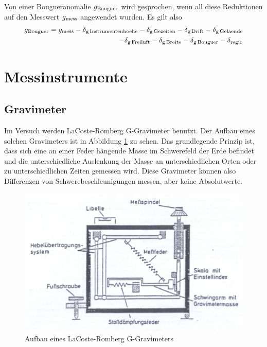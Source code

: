 Von einer Bougueranomalie $g_{\mathrm{Bouguer}}$ wird gesprochen, wenn all diese Reduktionen auf den Messwert $g_{\mathrm{mess}}$ angewendet wurden. Es gilt also
\begin{align}
 g_{\mathrm{Bouguer}}=g_{\mathrm{mess}}-\delta_{\mathrm{g\,Instrumentenhoehe}}-\delta_{\mathrm{g\,Gezeiten}}-\delta_{\mathrm{g\,Drift}}-\delta_{\mathrm{g\,Gelaende}} \\ \notag
 -\delta_{\mathrm{g\,Freiluft}}-\delta_{\mathrm{g\,Breite}}-\delta_{\mathrm{g\,Bouguer}}
 -\delta_{\mathrm{regio}}
\end{align}

\section{Messinstrumente}

\subsection{Gravimeter}

Im Versuch werden LaCoste-Romberg G-Gravimeter benutzt. Der Aufbau eines solchen Gravimeters ist in Abbildung \ref{fig:grav} zu sehen. Das grundlegende Prinzip ist, dass sich eine an einer Feder hängende Masse im Schwerefeld der Erde befindet und die unterschiedliche Auslenkung der Masse an unterschiedlichen Orten oder zu unterschiedlichen Zeiten gemessen wird. Diese Gravimeter können also Differenzen von Schwerebeschleunigungen messen, aber keine Absolutwerte.

\begin{figure}
    \centering
   \includegraphics[width=\textwidth]{fig/gravimeter}
 \caption[Aufbau eines LaCoste-Romberg G-Gravimeters]{Aufbau eines LaCoste-Romberg G-Gravimeters \cite{skript}}
 \label{fig:grav}
\end{figure}

